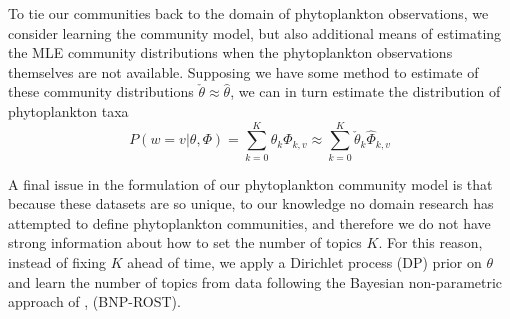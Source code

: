 To tie our communities back to the domain of phytoplankton observations, we consider learning the community model, but also additional means of estimating the MLE community distributions when the phytoplankton observations themselves are not available. Supposing we have some method to estimate of these community distributions $\check{\theta} \approx \hat{\theta}$, we can in turn estimate the distribution of phytoplankton taxa
\begin{equation} \label{eqn:word-estimate}
P(w = v | \theta, \Phi) = \sum_{k=0}^K \theta_k \Phi_{k,v} \approx \sum_{k=0}^K \check{\theta}_k \hat{\Phi}_{k,v}
\end{equation}

A final issue in the formulation of our phytoplankton community model is that because these datasets are so unique, to our knowledge no domain research has attempted to define phytoplankton communities, and therefore we do not have strong information about how to set the number of topics $K$. For this reason, instead of fixing $K$ ahead of time, we apply a Dirichlet process (DP) prior on $\theta$ and learn the number of topics from data following the Bayesian non-parametric approach of \citep{Girdhar2016}, (BNP-ROST).

